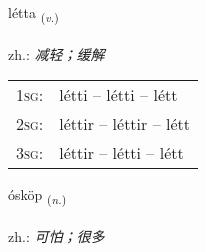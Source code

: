 \documentclass[frontgrid, backgrid]{flacards}\usepackage[]{graphicx}\usepackage[]{xcolor}
\begin{document}
\renewcommand{\flhead}{\vskip5pt \fboxsep=0pt {\small\bfseries\footnotesize Sagnorð | 动词}}
\renewcommand{\fcfoot}{\vskip5pt \fboxsep=0pt \hspace{2pt}{\small\bfseries\footnotesize 3K}}

\renewcommand{\blhead}{\vskip5pt {\small\bfseries\footnotesize Sagnorð | 动词 }}
\renewcommand{\bcfoot}{\vskip5pt \hspace{2pt}{\small\bfseries\footnotesize 3K}}


{létta \small{\textsubscript{(\textit{v.})}} \\[1ex] %
\textphonetic{[ljɛhta]} \\
zh.: \emph{减轻；缓解} \\  [2ex]
\renewcommand*{\arraystretch}{0.8}
\begin{tabular}{p{1cm}l}
\textsc{1sg}: & létti -- létti -- létt \\ 
\textsc{2sg}: & léttir -- léttir -- létt \\ 
\textsc{3sg}: & léttir -- létti -- létt \\ 
\end{tabular}
}

\renewcommand{\flhead}{\vskip5pt \fboxsep=0pt {\small\bfseries\footnotesize Nafnorð | 名词}}
\renewcommand{\fcfoot}{\vskip5pt \fboxsep=0pt \hspace{2pt}{\small\bfseries\footnotesize 3K}}

\renewcommand{\blhead}{\vskip5pt {\small\bfseries\footnotesize Nafnorð | 名词 }}
\renewcommand{\bcfoot}{\vskip5pt \hspace{2pt}{\small\bfseries\footnotesize 3K}}


{ósköp \small{\textsubscript{(\textit{n.})}} \\[1ex] %
\textphonetic{[ouːskœp]} \\
zh.: \emph{可怕；很多} \\  [2ex]
\renewcommand*{\arraystretch}{0.8}
}
\end{document}
